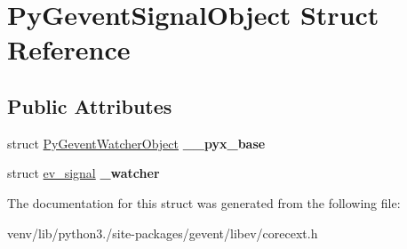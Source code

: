 \hypertarget{struct_py_gevent_signal_object}{}\section{Py\+Gevent\+Signal\+Object Struct Reference}
\label{struct_py_gevent_signal_object}
\subsection*{Public Attributes}
\begin{DoxyCompactItemize}
\item 
\mbox{\label{struct_py_gevent_signal_object_a7b647bfb375848e9e938d99da814c533}} 
struct \hyperlink{struct_py_gevent_watcher_object}{Py\+Gevent\+Watcher\+Object} {\bfseries \+\_\+\+\_\+pyx\+\_\+base}
\item 
\mbox{\label{struct_py_gevent_signal_object_acb98365ddacb6e54f655c7e99e75d6f2}} 
struct \hyperlink{structev__signal}{ev\+\_\+signal} {\bfseries \+\_\+watcher}
\end{DoxyCompactItemize}


The documentation for this struct was generated from the following file\+:\begin{DoxyCompactItemize}
\item 
venv/lib/python3./site-\/packages/gevent/libev/corecext.\+h\end{DoxyCompactItemize}
